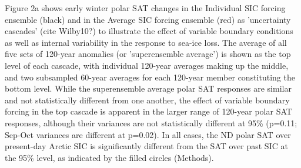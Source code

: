 \documentclass[grl]{AGUTeX}  %
\begin{document}
\begin{article}
Figure 2a shows early winter polar SAT changes in the Individual SIC forcing ensemble (black) and in the Average SIC forcing ensemble (red) as 'uncertainty cascades' (cite Wilby10?) to illustrate the effect of variable boundary conditions as well as internal variability in the response to sea-ice loss. The average of all five sets of 120-year anomalies (or 'superensemble average') is shown as the top level of each cascade, with individual 120-year averages making up the middle, and two subsampled 60-year averages for each 120-year member constituting the bottom level. While the superensemble average polar SAT responses are similar and not statistically different from one another, the effect of variable boundary forcing in the top cascade is apparent in the larger range of 120-year polar SAT responses, although their variances are not statistically different at 95\% (p=0.11; Sep-Oct variances are different at p=0.02). In all cases, the ND polar SAT over present-day Arctic SIC is significantly different from the SAT over past SIC at the 95\% level, as indicated by the filled circles (Methods). %


\end{article}
\end{document}
